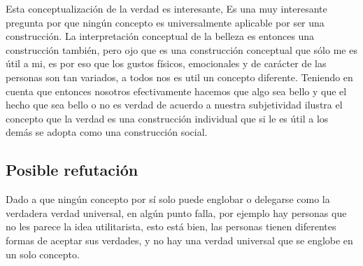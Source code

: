 \documentclass{article}
\begin{document}
Esta conceptualización de la verdad es interesante,  Es una muy interesante pregunta por que ningún concepto es universalmente aplicable por ser una construcción. 
La interpretación conceptual de la belleza es entonces una construcción también, pero ojo que es una construcción conceptual que sólo me es útil a mi, es por eso que los gustos físicos, emocionales y de carácter de las personas son tan variados, a todos nos es util un concepto diferente. 
Teniendo en cuenta que entonces nosotros efectivamente hacemos que algo sea bello y que el hecho que sea bello o no es verdad de acuerdo a nuestra subjetividad ilustra el concepto que la verdad es una construcción individual que si le es útil a los demás se adopta como una construcción social.

\subsection{Posible refutación}
Dado a que ningún concepto por sí solo puede englobar o delegarse como la verdadera verdad universal, en algún punto falla, por ejemplo hay personas que no les parece la idea utilitarista, esto está bien, las personas tienen diferentes formas de aceptar sus verdades, y no hay una verdad universal que se englobe en un solo concepto.

\end{document}
